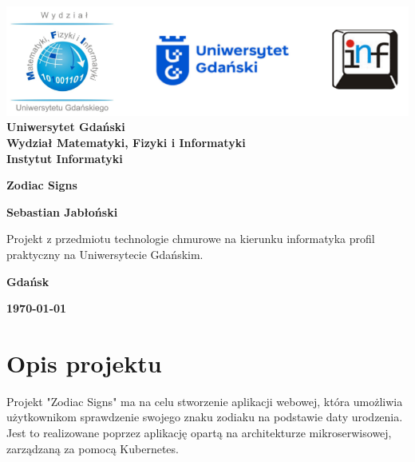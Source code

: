 \documentclass[12pt,a4paper]{article}
\newcommand{\hmwkTitle}{Zodiac Signs} %
\newcommand{\hmwkDueDate}{\today} %
\newcommand{\hmwkAuthorName}{Sebastian Jabłoński} %
\begin{document}
\begin{titlepage}
    \vfill
    \begin{center}
    \hspace*{-1cm}
    \vspace*{0.5cm}
    \includegraphics[scale=0.55]{imagens/loga.png}\\
    \textbf{Uniwersytet Gdański \\ [0.05cm]Wydział Matematyki, Fizyki i Informatyki \\ [0.05cm] Instytut Informatyki}

    \vspace{0.6cm}
    \vspace{4cm}
    {\huge \textbf{\hmwkTitle}}\vspace{8mm}
    
    {\large \textbf{\hmwkAuthorName}}\\[3cm]
    
        \hspace{.45\textwidth} %
       \begin{minipage}{.5\textwidth}
       Projekt z przedmiotu technologie chmurowe na kierunku informatyka profil praktyczny na Uniwersytecie Gdańskim.\\[0.1cm]
      \end{minipage}
      \vfill
    
    \textbf{Gdańsk}
    
    \textbf{\hmwkDueDate}
    \end{center}
    
\end{titlepage}

\newpage
\setcounter{secnumdepth}{5}
\tableofcontents
\newpage

\section{Opis projektu}
\label{sec:Project}

Projekt "Zodiac Signs" ma na celu stworzenie aplikacji webowej, która umożliwia użytkownikom sprawdzenie swojego znaku zodiaku na podstawie daty urodzenia. Jest to realizowane poprzez aplikację opartą na architekturze mikroserwisowej, zarządzaną za pomocą Kubernetes.
\end{document}
